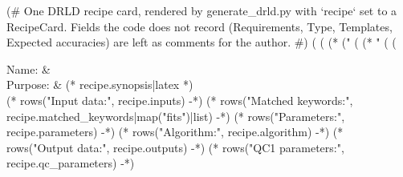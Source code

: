 (# One DRLD recipe card, rendered by generate_drld.py with `recipe` set to a RecipeCard.
   Fields the code does not record (Requirements, Type, Templates, Expected accuracies)
   are left as comments for the author. #)
(%
(%
  (* ("%
(%
  (* "%
(%
(%
\begin{recipedef}
  Name:                &  \\
  Purpose:             & (* recipe.synopsis|latex *) \\
(* rows("Input data:", recipe.inputs) -*)
(* rows("Matched keywords:", recipe.matched_keywords|map("fits")|list) -*)
(* rows("Parameters:", recipe.parameters) -*)
(* rows("Algorithm:", recipe.algorithm) -*)
(* rows("Output data:", recipe.outputs) -*)
(* rows("QC1 parameters:", recipe.qc_parameters) -*)
\end{recipedef}


